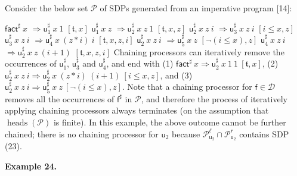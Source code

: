 \documentclass[10pt,a4paper]{amsart}
\begin{document}
Consider the below set $\mathcal{P}$ of SDPs generated from an imperative program [14]:\par
    $\displaystyle{\mathsf{fact}^{\sharp}}\ {x}$ $\displaystyle\Rightarrow{{\mathsf{u}_{1}^{\sharp}}\ {x}}\ {1}$ $\displaystyle[\mathfrak{t},x]$ $\displaystyle{{\mathsf{u}_{1}^{\sharp}}\ {x}}\ {z}$ $\displaystyle\Rightarrow{{{\mathsf{u}_{2}^{\sharp}}\ {x}}\ {z}}\ {1}$ $\displaystyle[\mathfrak{t},x,z]$     $\displaystyle{{{\mathsf{u}_{2}^{\sharp}}\ {x}}\ {z}}\ {i}$ $\displaystyle\Rightarrow{{{\mathsf{u}_{3}^{\sharp}}\ {x}}\ {z}}\ {i}$ $\displaystyle[i\leq x,z]$ $\displaystyle{{{\mathsf{u}_{3}^{\sharp}}\ {x}}\ {z}}\ {i}$ $\displaystyle\Rightarrow{{{\mathsf{u}_{4}^{\sharp}}\ {x}}\ {(z*i)}}\ {i}$ $\displaystyle[\mathfrak{t},x,z,i]$     $\displaystyle{{{\mathsf{u}_{2}^{\sharp}}\ {x}}\ {z}}\ {i}$ $\displaystyle\Rightarrow{{\mathsf{u}_{5}^{\sharp}}\ {x}}\ {z}$ $\displaystyle[\neg(i\leq x),z]$ $\displaystyle{{{\mathsf{u}_{4}^{\sharp}}\ {x}}\ {z}}\ {i}$ $\displaystyle\Rightarrow{{{\mathsf{u}_{2}^{\sharp}}\ {x}}\ {z}}\ {(i+1)}$ $\displaystyle[\mathfrak{t},x,z,i]$    
Chaining processors can iteratively remove the occurrences of $\mathsf{u}_{1}^{\sharp}$, $\mathsf{u}_{3}^{\sharp}$ and $\mathsf{u}_{4}^{\sharp}$, and end with (1) ${{\mathsf{fact}^{\sharp}}\ {x}}\Rightarrow{{{{\mathsf{u}_{2}^{\sharp}}\ {x}}\ {1}}\ {1}}\ [\mathfrak{t},x]$, (2) ${{{{\mathsf{u}_{2}^{\sharp}}\ {x}}\ {z}}\ {i}}\Rightarrow{{{{\mathsf{u}_{2}^{\sharp}}\ {x}}\ {(z*i)}}\ {(i+1)}}\ [i\leq x,z]$, and (3) ${{{{\mathsf{u}_{2}^{\sharp}}\ {x}}\ {z}}\ {i}}\Rightarrow{{{\mathsf{u}_{5}^{\sharp}}\ {x}}\ {z}}\ [\neg(i\leq x),z]$. Note that a chaining processor for $\mathsf{f}\in\mathcal{D}$ removes all the occurrences of $\mathsf{f}^{\sharp}$ in $\mathcal{P}$, and therefore the process of iteratively applying chaining processors always terminates (on the assumption that $\operatorname{heads}(\mathcal{P})$ is finite). In this example, the above outcome cannot be further chained; there is no chaining processor for $\mathsf{u}_{2}$ because $\mathcal{P}_{\mathsf{u}_{2}}^{\ell}\cap\mathcal{P}_{\mathsf{u}_{2}}^{r}$ contains SDP (23).\par
 
 
 
 
\par\medskip\noindent\textbf{Example 24.}\par
 
 
\end{document}
